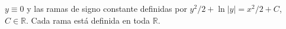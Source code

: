 $y\equiv0$ y las ramas de signo constante definidas por $y^2/2+\ln|y|=x^2/2+C$, $C\in\mathbb R$. Cada rama está definida en toda $\mathbb R$.
